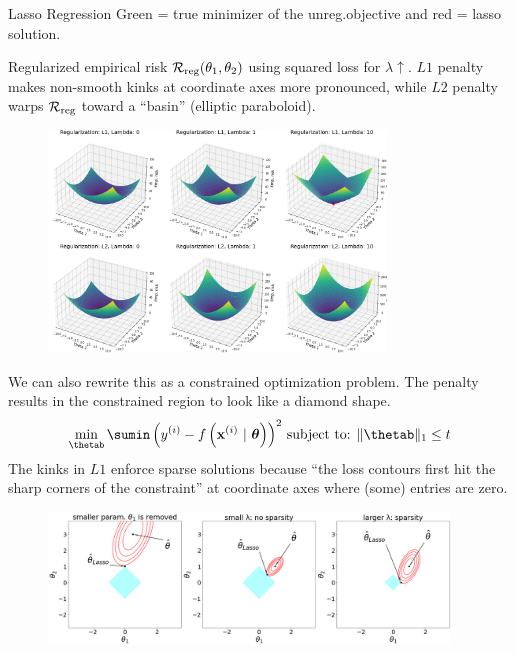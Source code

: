 \documentclass[11pt,compress,t,notes=noshow, xcolor=table]{beamer}
\begin{document}
\begin{vbframe}{Lasso Regression}
Green  = true minimizer of the unreg.objective and red = lasso solution.

\framebreak

Regularized empirical risk $\mathcal{R}_{\text{reg}}(\theta_1,\theta_2)$ using squared loss for $\lambda \uparrow$. $L1$ penalty makes non-smooth kinks at coordinate axes more pronounced, while $L2$ penalty warps $\mathcal{R}_{\text{reg}}$ toward a ``basin'' (elliptic paraboloid). 
 
\begin{figure}
\includegraphics[width=0.8\textwidth]{figure/reg_surfaces_l1_l2.png}\\
\end{figure}

\framebreak

We can also rewrite this as a constrained optimization problem. The penalty results in the constrained region to look like a diamond shape.
\vspace{-0.2cm}
\begin{eqnarray*}
\min_{\thetab} \sumin \left(\yi - \fxit\right)^2\,
\text{subject to: } \|\thetab\|_1 \leq t
\end{eqnarray*}
The kinks in $L1$ enforce sparse solutions because ``the loss contours first hit the sharp corners of the constraint'' at coordinate axes where (some) entries are zero. 
\vspace{-0.1cm}
\begin{figure}%
\includegraphics[width=0.95\textwidth]
{figure_man/lasso_contours_cases.png}\\
\end{figure}

\end{vbframe}
\end{document}
